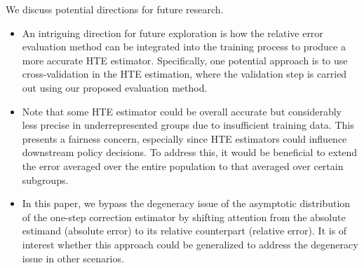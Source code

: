 \documentclass[twoside]{article}
\newcommand{\1}{{\mathbbm{1}}}
\begin{document}
We discuss potential directions for future research. 
\begin{itemize}
    \item 
    An intriguing direction for future exploration is how the relative error evaluation method can be integrated into the training process to produce a more accurate HTE estimator. Specifically, one potential approach is to use cross-validation in the HTE estimation, where the validation step is carried out using our proposed evaluation method. 

    \item 
    Note that some HTE estimator could be overall accurate but considerably less precise in underrepresented groups due to insufficient training data. 
    This presents a fairness concern, especially since HTE estimators could influence downstream policy decisions. To address this, it would be beneficial to extend the error averaged over the entire population to that averaged over certain subgroups.

    
    \item In this paper, we bypass the degeneracy issue of the asymptotic distribution of the one-step correction estimator by shifting attention from the absolute estimand (absolute error) to its relative counterpart (relative error). It is of interest whether this approach could be generalized to address the degeneracy issue in other scenarios.
\end{itemize}




\printbibliography


\clearpage


\end{document}
